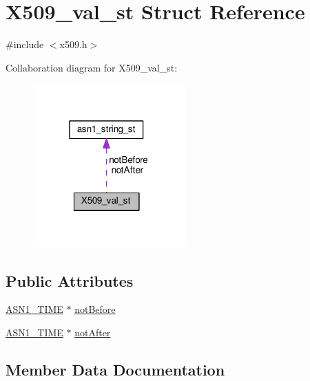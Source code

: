 \hypertarget{struct_x509__val__st}{}\section{X509\+\_\+val\+\_\+st Struct Reference}
\label{struct_x509__val__st}


{\ttfamily \#include $<$x509.\+h$>$}



Collaboration diagram for X509\+\_\+val\+\_\+st\+:
\nopagebreak
\begin{figure}[H]
\begin{center}
\leavevmode
\includegraphics[width=166pt]{struct_x509__val__st__coll__graph}
\end{center}
\end{figure}
\subsection*{Public Attributes}
\begin{DoxyCompactItemize}
\item 
\hyperlink{ossl__typ_8h_ad8d7393bc444b691d2b2c20d247b4e27}{A\+S\+N1\+\_\+\+T\+I\+ME} $\ast$ \hyperlink{struct_x509__val__st_a49893ccde75b6fb542b3188fe158530d}{not\+Before}
\item 
\hyperlink{ossl__typ_8h_ad8d7393bc444b691d2b2c20d247b4e27}{A\+S\+N1\+\_\+\+T\+I\+ME} $\ast$ \hyperlink{struct_x509__val__st_a9d46618a37d4511c009469509b883838}{not\+After}
\end{DoxyCompactItemize}


\subsection{Member Data Documentation}
